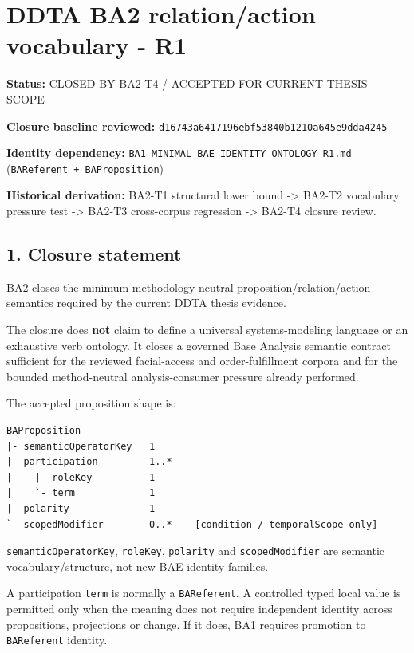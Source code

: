 \documentclass[11pt,a4paper]{article}
\begin{document}
\section{DDTA BA2 relation/action vocabulary - R1}\label{ddta-ba2-relationaction-vocabulary---r1}

\textbf{Status:} CLOSED BY BA2-T4 / ACCEPTED FOR CURRENT THESIS SCOPE

\textbf{Closure baseline reviewed:} \texttt{d16743a6417196ebf53840b1210a645e9dda4245}

\textbf{Identity dependency:} \texttt{BA1\_MINIMAL\_BAE\_IDENTITY\_ONTOLOGY\_R1.md} (\texttt{BAReferent\ +\ BAProposition})

\textbf{Historical derivation:} BA2-T1 structural lower bound -\textgreater{} BA2-T2 vocabulary pressure test -\textgreater{} BA2-T3 cross-corpus regression -\textgreater{} BA2-T4 closure review.

\subsection{1. Closure statement}\label{closure-statement}

BA2 closes the minimum methodology-neutral proposition/relation/action semantics required by the current DDTA thesis evidence.

The closure does \textbf{not} claim to define a universal systems-modeling language or an exhaustive verb ontology. It closes a governed Base Analysis semantic contract sufficient for the reviewed facial-access and order-fulfillment corpora and for the bounded method-neutral analysis-consumer pressure already performed.

The accepted proposition shape is:

\begin{verbatim}
BAProposition
|- semanticOperatorKey   1
|- participation         1..*
|    |- roleKey          1
|    `- term             1
|- polarity              1
`- scopedModifier        0..*    [condition / temporalScope only]
\end{verbatim}

\texttt{semanticOperatorKey}, \texttt{roleKey}, \texttt{polarity} and \texttt{scopedModifier} are semantic vocabulary/structure, not new BAE identity families.

A participation \texttt{term} is normally a \texttt{BAReferent}. A controlled typed local value is permitted only when the meaning does not require independent identity across propositions, projections or change. If it does, BA1 requires promotion to \texttt{BAReferent} identity.
\end{document}
